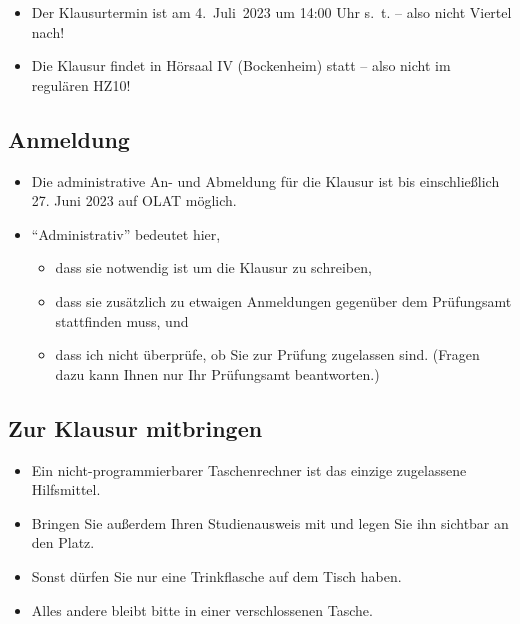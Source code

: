 \documentclass[
  11pt,
  ngerman,
  a4paper,
]{report}
\providecommand{\tightlist}{%
  \setlength{\itemsep}{0pt}\setlength{\parskip}{0pt}}
\begin{document}
\begin{itemize}
\tightlist
\item
  Der Klausurtermin ist am 4.~Juli~2023 um 14:00 Uhr s.~t. -- also nicht Viertel nach!
\item
  Die Klausur findet in Hörsaal IV (Bockenheim) statt -- also nicht im regulären HZ10!
\end{itemize}

\hypertarget{anmeldung}{%
\subsection*{Anmeldung}\label{anmeldung}}

\begin{itemize}
\tightlist
\item
  Die administrative An- und Abmeldung für die Klausur ist bis einschließlich 27. Juni 2023 auf OLAT möglich.
\item
  \enquote{Administrativ} bedeutet hier,

  \begin{itemize}
  \tightlist
  \item
    dass sie notwendig ist um die Klausur zu schreiben,
  \item
    dass sie zusätzlich zu etwaigen Anmeldungen gegenüber dem Prüfungsamt stattfinden muss, und
  \item
    dass ich nicht überprüfe, ob Sie zur Prüfung zugelassen sind. (Fragen dazu kann Ihnen nur Ihr Prüfungsamt beantworten.)
  \end{itemize}
\end{itemize}

\hypertarget{zur-klausur-mitbringen}{%
\subsection*{Zur Klausur mitbringen}\label{zur-klausur-mitbringen}}

\begin{itemize}
\tightlist
\item
  Ein nicht-programmierbarer Taschenrechner ist das einzige zugelassene Hilfsmittel.
\item
  Bringen Sie außerdem Ihren Studienausweis mit und legen Sie ihn sichtbar an den Platz.
\item
  Sonst dürfen Sie nur eine Trinkflasche auf dem Tisch haben.
\item
  Alles andere bleibt bitte in einer verschlossenen Tasche.
\end{itemize}
\end{document}
